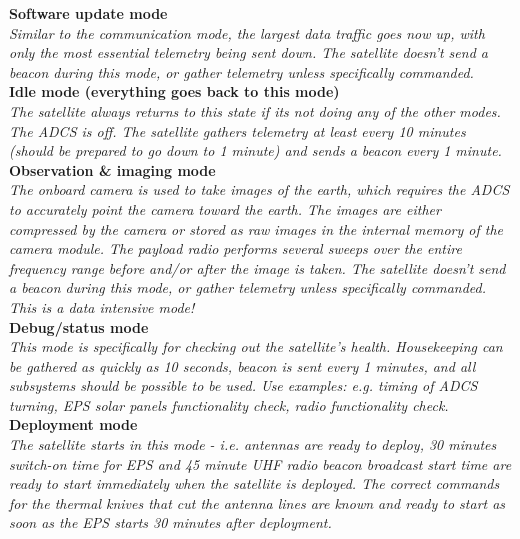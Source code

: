 \documentclass[english,12pt,a4paper,pdftex,elec,utf8]{aaltothesis}
\begin{document}
\textbf{Software update mode}\\
\textit{Similar to the communication mode, the largest data traffic goes now up, with only the most essential telemetry being sent down. The satellite doesn't send a beacon during this mode, or gather telemetry unless specifically commanded.}\\
\textbf{Idle mode (everything goes back to this mode)}\\
\textit{The satellite always returns to this state if its not doing any of the other modes. The ADCS is off. The satellite gathers telemetry at least every 10 minutes (should be prepared to go down to 1 minute) and sends a beacon every 1 minute.}\\
\textbf{Observation \& imaging mode}\\
\textit{The onboard camera is used to take images of the earth, which requires the ADCS to accurately point the camera toward the earth. The images are either compressed by the camera or stored as raw images in the internal memory of the camera module. The payload radio performs several sweeps over the entire frequency range before and/or after the image is taken. The satellite doesn't send a beacon during this mode, or gather telemetry unless specifically commanded. This is a data intensive mode!}\\
\textbf{Debug/status mode}\\
\textit{This mode is specifically for checking out the satellite's health. Housekeeping can be gathered as quickly as 10 seconds, beacon is sent every 1 minutes, and all subsystems should be possible to be used. Use examples: e.g. timing of ADCS turning, EPS solar panels functionality check, radio functionality check.}\\
\textbf{Deployment mode}\\
\textit{The satellite starts in this mode - i.e. antennas are ready to deploy, 30 minutes switch-on time for EPS and 45 minute UHF radio beacon broadcast start time are ready to start immediately when the satellite is deployed. The correct commands for the thermal knives that cut the antenna lines are known and ready to start as soon as the EPS starts 30 minutes after deployment.}\par
\end{document}
